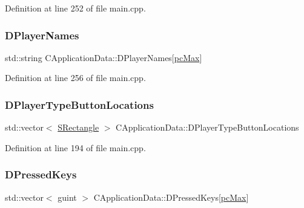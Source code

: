 Definition at line 252 of file main.\+cpp.

\hypertarget{classCApplicationData_a446d88c378b95b1a4f88071612229086}{}\label{classCApplicationData_a446d88c378b95b1a4f88071612229086} 
\subsubsection{\texorpdfstring{D\+Player\+Names}{DPlayerNames}}
{\footnotesize\ttfamily std\+::string C\+Application\+Data\+::\+D\+Player\+Names\mbox{[}\hyperlink{GameDataTypes_8h_aafb0ca75933357ff28a6d7efbdd7602fa594a5c8dd3987f24e8a0f23f1a72cd34}{pc\+Max}\mbox{]}\hspace{0.3cm}{\ttfamily [protected]}}



Definition at line 256 of file main.\+cpp.

\hypertarget{classCApplicationData_a49d2ad6ab469e18577716ac993b475cb}{}\label{classCApplicationData_a49d2ad6ab469e18577716ac993b475cb} 
\subsubsection{\texorpdfstring{D\+Player\+Type\+Button\+Locations}{DPlayerTypeButtonLocations}}
{\footnotesize\ttfamily std\+::vector$<$ \hyperlink{structSRectangle}{S\+Rectangle} $>$ C\+Application\+Data\+::\+D\+Player\+Type\+Button\+Locations\hspace{0.3cm}{\ttfamily [protected]}}



Definition at line 194 of file main.\+cpp.

\hypertarget{classCApplicationData_ac6f50c764f7561c0bd2a9fbce55b2701}{}\label{classCApplicationData_ac6f50c764f7561c0bd2a9fbce55b2701} 
\subsubsection{\texorpdfstring{D\+Pressed\+Keys}{DPressedKeys}}
{\footnotesize\ttfamily std\+::vector$<$ guint $>$ C\+Application\+Data\+::\+D\+Pressed\+Keys\mbox{[}\hyperlink{GameDataTypes_8h_aafb0ca75933357ff28a6d7efbdd7602fa594a5c8dd3987f24e8a0f23f1a72cd34}{pc\+Max}\mbox{]}\hspace{0.3cm}{\ttfamily [protected]}}



